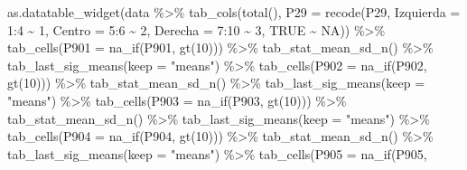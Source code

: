 \documentclass[
]{book}
\newenvironment{Shaded}{\begin{snugshade}}{\end{snugshade}}
\newcommand{\AttributeTok}[1]{\textcolor[rgb]{0.77,0.63,0.00}{#1}}
\newcommand{\ConstantTok}[1]{\textcolor[rgb]{0.00,0.00,0.00}{#1}}
\newcommand{\DecValTok}[1]{\textcolor[rgb]{0.00,0.00,0.81}{#1}}
\newcommand{\FunctionTok}[1]{\textcolor[rgb]{0.00,0.00,0.00}{#1}}
\newcommand{\NormalTok}[1]{#1}
\newcommand{\SpecialCharTok}[1]{\textcolor[rgb]{0.00,0.00,0.00}{#1}}
\newcommand{\StringTok}[1]{\textcolor[rgb]{0.31,0.60,0.02}{#1}}
\begin{document}
\begin{Shaded}
\begin{Highlighting}[]
\FunctionTok{as.datatable\_widget}\NormalTok{(data }\SpecialCharTok{\%\textgreater{}\%} \FunctionTok{tab\_cols}\NormalTok{(}\FunctionTok{total}\NormalTok{(), }\AttributeTok{P29 =} \FunctionTok{recode}\NormalTok{(P29, }
  \AttributeTok{Izquierda =} \DecValTok{1}\SpecialCharTok{:}\DecValTok{4} \SpecialCharTok{\textasciitilde{}} \DecValTok{1}\NormalTok{, }\AttributeTok{Centro =} \DecValTok{5}\SpecialCharTok{:}\DecValTok{6} \SpecialCharTok{\textasciitilde{}} \DecValTok{2}\NormalTok{, }\AttributeTok{Derecha =} \DecValTok{7}\SpecialCharTok{:}\DecValTok{10} \SpecialCharTok{\textasciitilde{}} 
    \DecValTok{3}\NormalTok{, }\ConstantTok{TRUE} \SpecialCharTok{\textasciitilde{}} \ConstantTok{NA}\NormalTok{)) }\SpecialCharTok{\%\textgreater{}\%} \FunctionTok{tab\_cells}\NormalTok{(}\AttributeTok{P901 =} \FunctionTok{na\_if}\NormalTok{(P901, }\FunctionTok{gt}\NormalTok{(}\DecValTok{10}\NormalTok{))) }\SpecialCharTok{\%\textgreater{}\%} 
  \FunctionTok{tab\_stat\_mean\_sd\_n}\NormalTok{() }\SpecialCharTok{\%\textgreater{}\%} \FunctionTok{tab\_last\_sig\_means}\NormalTok{(}\AttributeTok{keep =} \StringTok{"means"}\NormalTok{) }\SpecialCharTok{\%\textgreater{}\%} 
  \FunctionTok{tab\_cells}\NormalTok{(}\AttributeTok{P902 =} \FunctionTok{na\_if}\NormalTok{(P902, }\FunctionTok{gt}\NormalTok{(}\DecValTok{10}\NormalTok{))) }\SpecialCharTok{\%\textgreater{}\%} \FunctionTok{tab\_stat\_mean\_sd\_n}\NormalTok{() }\SpecialCharTok{\%\textgreater{}\%} 
  \FunctionTok{tab\_last\_sig\_means}\NormalTok{(}\AttributeTok{keep =} \StringTok{"means"}\NormalTok{) }\SpecialCharTok{\%\textgreater{}\%} \FunctionTok{tab\_cells}\NormalTok{(}\AttributeTok{P903 =} \FunctionTok{na\_if}\NormalTok{(P903, }
  \FunctionTok{gt}\NormalTok{(}\DecValTok{10}\NormalTok{))) }\SpecialCharTok{\%\textgreater{}\%} \FunctionTok{tab\_stat\_mean\_sd\_n}\NormalTok{() }\SpecialCharTok{\%\textgreater{}\%} \FunctionTok{tab\_last\_sig\_means}\NormalTok{(}\AttributeTok{keep =} \StringTok{"means"}\NormalTok{) }\SpecialCharTok{\%\textgreater{}\%} 
  \FunctionTok{tab\_cells}\NormalTok{(}\AttributeTok{P904 =} \FunctionTok{na\_if}\NormalTok{(P904, }\FunctionTok{gt}\NormalTok{(}\DecValTok{10}\NormalTok{))) }\SpecialCharTok{\%\textgreater{}\%} \FunctionTok{tab\_stat\_mean\_sd\_n}\NormalTok{() }\SpecialCharTok{\%\textgreater{}\%} 
  \FunctionTok{tab\_last\_sig\_means}\NormalTok{(}\AttributeTok{keep =} \StringTok{"means"}\NormalTok{) }\SpecialCharTok{\%\textgreater{}\%} \FunctionTok{tab\_cells}\NormalTok{(}\AttributeTok{P905 =} \FunctionTok{na\_if}\NormalTok{(P905, }

\end{Highlighting}
\end{Shaded}
\end{document}
